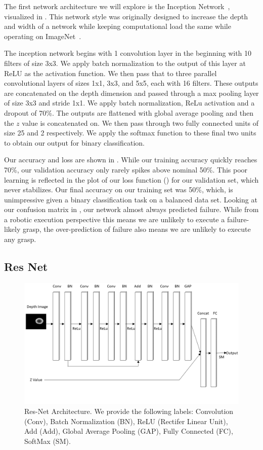 The first network architecture we will explore is the Inception Network~\cite{szegedy2015going}, visualized in . 
This network style was originally designed to increase the depth and width of a network while keeping computational load the same while operating on ImageNet~\cite{deng2009imagenet}. 

The inception network begins with 1 convolution layer in the beginning with 10 filters of size 3x3. 
We apply batch normalization to the output of this layer at ReLU as the activation function. 
We then pass that to three parallel convolutional layers of sizes 1x1, 3x3, and 5x5, each with 16 filters. 
These outputs are concatenated on the depth dimension and passed through a max pooling layer of size 3x3 and stride 1x1.
We apply batch normalization, ReLu activation and a dropout of 70\%. 
The outputs are flattened with global average pooling and then the $z$ value is concatenated on. 
We then pass through two fully connected units of size 25 and 2 respectively.  
We apply the softmax function to these final two units to obtain our output for binary classification.

Our accuracy and loss are shown in . 
While our training accuracy quickly reaches 70\%, our validation accuracy only rarely spikes above nominal 50\%. 
This poor learning is reflected in the plot of our loss function () for our validation set, which never stabilizes. 
Our final accuracy on our training set was 50\%, which, is unimpressive given a binary classification task on a balanced data set. 
Looking at our confusion matrix in , our network almost always predicted failure. 
While from a robotic execution perspective this means we are unlikely to execute a failure-likely grasp, the over-prediction of failure also means we are unlikely to execute any grasp. 


\subsection{Res Net}

\begin{figure}[t!]
    \includegraphics[width=0.99\columnwidth]{figs/res_net.png}
\caption{Res-Net Architecture. We provide the following labels: Convolution (Conv), Batch Normalization (BN), ReLU (Rectifer Linear Unit), Add (Add), Global Average Pooling (GAP), Fully Connected (FC), SoftMax (SM).} \label{fig:res_net}
\end{figure}


